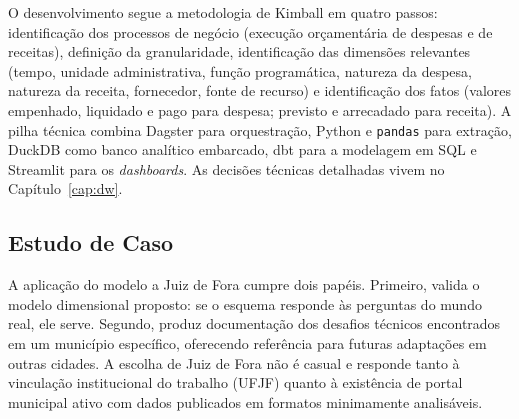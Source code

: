 O desenvolvimento segue a metodologia de Kimball em quatro passos: identificação dos processos de negócio (execução orçamentária de despesas e de receitas), definição da granularidade, identificação das dimensões relevantes (tempo, unidade administrativa, função programática, natureza da despesa, natureza da receita, fornecedor, fonte de recurso) e identificação dos fatos (valores empenhado, liquidado e pago para despesa; previsto e arrecadado para receita). A pilha técnica combina Dagster para orquestração, Python e \texttt{pandas} para extração, DuckDB como banco analítico embarcado, dbt para a modelagem em SQL e Streamlit para os \textit{dashboards}. As decisões técnicas detalhadas vivem no Capítulo~\ref{cap:dw}.

\subsection*{Estudo de Caso}

A aplicação do modelo a Juiz de Fora cumpre dois papéis. Primeiro, valida o modelo dimensional proposto: se o esquema responde às perguntas do mundo real, ele serve. Segundo, produz documentação dos desafios técnicos encontrados em um município específico, oferecendo referência para futuras adaptações em outras cidades. A escolha de Juiz de Fora não é casual e responde tanto à vinculação institucional do trabalho (UFJF) quanto à existência de portal municipal ativo com dados publicados em formatos minimamente analisáveis.